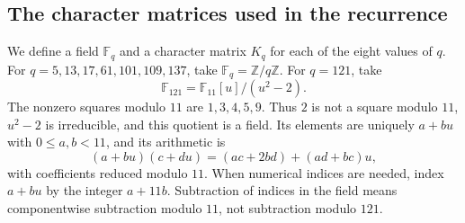 \documentclass[10pt]{article}
\begin{document}
\subsection{The character matrices used in the recurrence}

We define a field $\mathbb F_q$ and a character matrix $K_q$ for each
of the eight values of $q$. For $q=5,13,17,61,101,109,137$, take
$\mathbb F_q=\mathbb Z/q\mathbb Z$. For $q=121$, take
\[
 \mathbb F_{121}=\mathbb F_{11}[u]/(u^2-2).
\]
The nonzero squares modulo $11$ are $1,3,4,5,9$. Thus $2$ is not a
square modulo $11$, $u^2-2$ is irreducible, and this quotient is a field.
Its elements are uniquely $a+bu$ with $0\leq a,b<11$, and its arithmetic is
\[
 (a+bu)(c+du)=(ac+2bd)+(ad+bc)u,
\]
with coefficients reduced modulo $11$. When numerical indices are needed,
index $a+bu$ by the integer $a+11b$. Subtraction of indices in the field
means componentwise subtraction modulo $11$, not subtraction modulo $121$.
\end{document}
